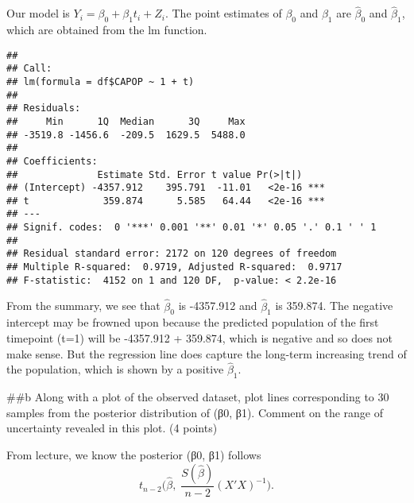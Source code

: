 \documentclass[
]{article}
\newenvironment{Shaded}{\begin{snugshade}}{\end{snugshade}}
\newcommand{\CommentTok}[1]{\textcolor[rgb]{0.56,0.35,0.01}{\textit{#1}}}
\newcommand{\DecValTok}[1]{\textcolor[rgb]{0.00,0.00,0.81}{#1}}
\newcommand{\FunctionTok}[1]{\textcolor[rgb]{0.00,0.00,0.00}{#1}}
\newcommand{\NormalTok}[1]{#1}
\newcommand{\OtherTok}[1]{\textcolor[rgb]{0.56,0.35,0.01}{#1}}
\newcommand{\SpecialCharTok}[1]{\textcolor[rgb]{0.00,0.00,0.00}{#1}}
\begin{document}
Our model is \(Y_i = \beta_0 + \beta_1 t_i + Z_i\). The point estimates
of \(\beta_0\) and \(\beta_1\) are \(\hat\beta_0\) and \(\hat\beta_1\),
which are obtained from the lm function.

\begin{Shaded}
\end{Shaded}

\begin{verbatim}
## 
## Call:
## lm(formula = df$CAPOP ~ 1 + t)
## 
## Residuals:
##     Min      1Q  Median      3Q     Max 
## -3519.8 -1456.6  -209.5  1629.5  5488.0 
## 
## Coefficients:
##              Estimate Std. Error t value Pr(>|t|)    
## (Intercept) -4357.912    395.791  -11.01   <2e-16 ***
## t             359.874      5.585   64.44   <2e-16 ***
## ---
## Signif. codes:  0 '***' 0.001 '**' 0.01 '*' 0.05 '.' 0.1 ' ' 1
## 
## Residual standard error: 2172 on 120 degrees of freedom
## Multiple R-squared:  0.9719, Adjusted R-squared:  0.9717 
## F-statistic:  4152 on 1 and 120 DF,  p-value: < 2.2e-16
\end{verbatim}

From the summary, we see that \(\hat\beta_0\) is -4357.912 and
\(\hat\beta_1\) is 359.874. The negative intercept may be frowned upon
because the predicted population of the first timepoint (t=1) will be
-4357.912 + 359.874, which is negative and so does not make sense. But
the regression line does capture the long-term increasing trend of the
population, which is shown by a positive \(\hat\beta_1\).

\#\#b Along with a plot of the observed dataset, plot lines
corresponding to 30 samples from the posterior distribution of (β0, β1).
Comment on the range of uncertainty revealed in this plot. (4 points)

From lecture, we know the posterior (β0, β1) follows
\[t_{n-2}\big(\hat\beta, \; \frac{S(\hat\beta)}{n-2}(X'X)^{-1}\big).\]

\begin{Shaded}
\end{Shaded}
\end{document}
